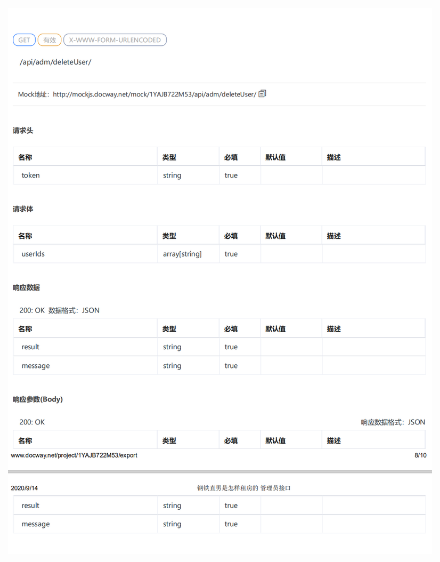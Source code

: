 \begin{figure}[h]
    \centering
    \includegraphics[height=19.0cm,width=14.0cm]{design/image/api41.png} 
    \end{figure}  
    \newpage